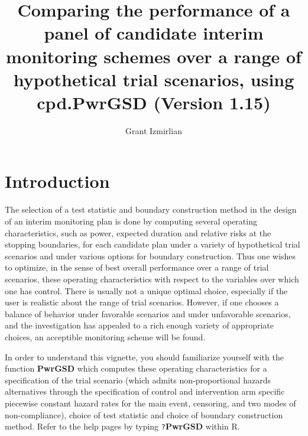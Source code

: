 \documentclass{article}
\begin{document}
\title{Comparing the performance of a panel of candidate interim monitoring schemes over
  a range of hypothetical trial scenarios, using cpd.PwrGSD (Version 1.15)}
\author{Grant Izmirlian}
\maketitle

\section{Introduction}
The selection of a test statistic and boundary construction method in the design of an
interim monitoring plan is done by computing several operating characteristics, such as
power, expected duration and relative risks at the stopping boundaries, for each candidate
plan under a variety of hypothetical trial scenarios and under various options for
boundary construction. Thus one wishes to optimize, in the sense of best overall
performance over a range of trial scenarios, these operating characteristics with respect
to the variables over which one has control.  There is usually not a unique optimal
choice, especially if the user is realistic about the range of trial scenarios. However,
if one chooses a balance of behavior under favorable scenarios and under unfavorable
scenarios, and the investigation has appealed to a rich enough variety of appropriate 
choices, an acceptible monitoring scheme will be found. 


In order to understand this vignette, you should familiarize
yourself with the function {\bf PwrGSD} which computes these operating characteristics
for a specification of the trial scenario (which admits non-proportional hazards
alternatives through the specification of control and intervention arm specific piecewise
constant hazard rates for the main event, censoring, and two modes of non-compliance),
choice of test statistic and choice of boundary construction method. Refer to the help
pages by typing \verb`?`{\bf PwrGSD} within R. 
\end{document}
